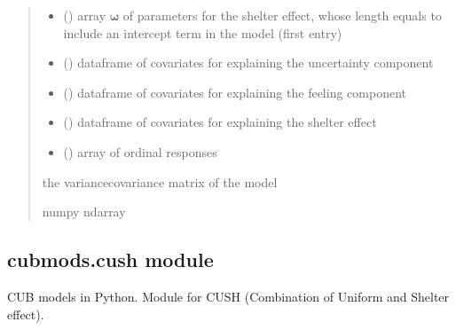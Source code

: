\documentclass[letterpaper,10pt,english]{sphinxmanual}
\begin{document}
\begin{fulllineitems}
\begin{quote}
\begin{description}
\begin{itemize}
\item {} 
\sphinxAtStartPar
{} () \textendash{} array \(\pmb \omega\) of parameters for the shelter effect, whose length equals 
 to include an intercept term in the model (first entry)

\item {} 
\sphinxAtStartPar
{} () \textendash{} dataframe of covariates for explaining the uncertainty component

\item {} 
\sphinxAtStartPar
{} () \textendash{} dataframe of covariates for explaining the feeling component

\item {} 
\sphinxAtStartPar
{} () \textendash{} dataframe of covariates for explaining the shelter effect

\item {} 
\sphinxAtStartPar
{} () \textendash{} array of ordinal responses

\end{itemize}

\sphinxAtStartPar
the variance\sphinxhyphen{}covariance matrix of the model

\sphinxAtStartPar
numpy ndarray

\end{description}\end{quote}

\end{fulllineitems}



\subsection{cubmods.cush module}
\label{\detokenize{cubmods:module-cubmods.cush}}\label{\detokenize{cubmods:cubmods-cush-module}}\label{\detokenize{cubmods:cush0-module}}
\sphinxAtStartPar
CUB models in Python.
Module for CUSH (Combination of Uniform
and Shelter effect).
\end{document}
